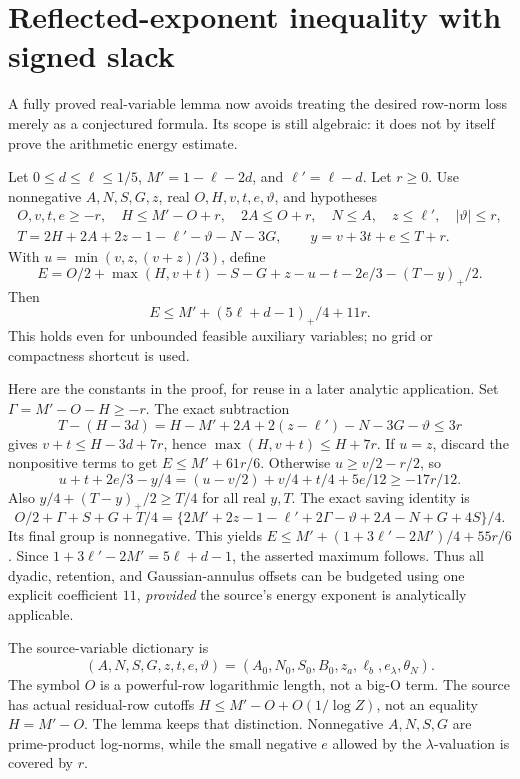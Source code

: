 \documentclass[12pt]{article}
\begin{document}
\section{Reflected-exponent inequality with signed slack}
A fully proved real-variable lemma now avoids treating the desired
row-norm loss merely as a conjectured formula.  Its scope is still
algebraic: it does not by itself prove the arithmetic energy estimate.

Let \(0\le d\le\ell\le1/5\), \(M'=1-\ell-2d\), and
\(\ell'=\ell-d\).  Let \(r\ge0\).  Use nonnegative
\(A,N,S,G,z\), real \(O,H,v,t,e,\vartheta\), and hypotheses
\[
\begin{gathered}
 O,v,t,e\ge-r,\quad H\le M'-O+r,\quad 2A\le O+r,\quad
 N\le A,\quad z\le\ell',\quad |\vartheta|\le r,\\
 T=2H+2A+2z-1-\ell'-\vartheta-N-3G,\qquad
 y=v+3t+e\le T+r .
\end{gathered}
\]
With \(u=\min(v,z,(v+z)/3)\), define
\[
 E=O/2+\max(H,v+t)-S-G+z-u-t-2e/3-(T-y)_+/2 .
\]
Then
\[
 E\le M'+(5\ell+d-1)_+/4+11r .
\]
This holds even for unbounded feasible auxiliary variables; no
grid or compactness shortcut is used.

Here are the constants in the proof, for reuse in a later analytic
application.  Set \(\Gamma=M'-O-H\ge-r\).  The exact subtraction
\[
 T-(H-3d)=H-M'+2A+2(z-\ell')-N-3G-\vartheta\le3r
\]
gives \(v+t\le H-3d+7r\), hence
\(\max(H,v+t)\le H+7r\).
If \(u=z\), discard the nonpositive terms to get
\(E\le M'+61r/6\).  Otherwise
\(u\ge v/2-r/2\), so
\[
 u+t+2e/3-y/4
 =(u-v/2)+v/4+t/4+5e/12\ge-17r/12.
\]
Also \(y/4+(T-y)_+/2\ge T/4\) for all real \(y,T\).
The exact saving identity is
\[
 O/2+\Gamma+S+G+T/4
 =\{2M'+2z-1-\ell'+2\Gamma-\vartheta+
                     2A-N+G+4S\}/4 .
\]
Its final group is nonnegative.  This yields
\(E\le M'+(1+3\ell'-2M')/4+55r/6\).
Since \(1+3\ell'-2M'=5\ell+d-1\), the asserted maximum follows.
Thus all dyadic, retention, and Gaussian-annulus offsets can be
budgeted using one explicit coefficient \(11\), \emph{provided}
the source's energy exponent is analytically applicable.

The source-variable dictionary is
\[
 (A,N,S,G,z,t,e,\vartheta)
 =(A_0,N_0,S_0,B_0,z_a,\ell_b,e_\lambda,\theta_N).
\]
The symbol \(O\) is a powerful-row logarithmic length, not a big-O
term.  The source has actual residual-row cutoffs
\(H\le M'-O+O(1/\log Z)\), not an equality \(H=M'-O\).
The lemma keeps that distinction.  Nonnegative \(A,N,S,G\) are
prime-product log-norms, while the small negative \(e\) allowed
by the \(\lambda\)-valuation is covered by \(r\).
\end{document}

